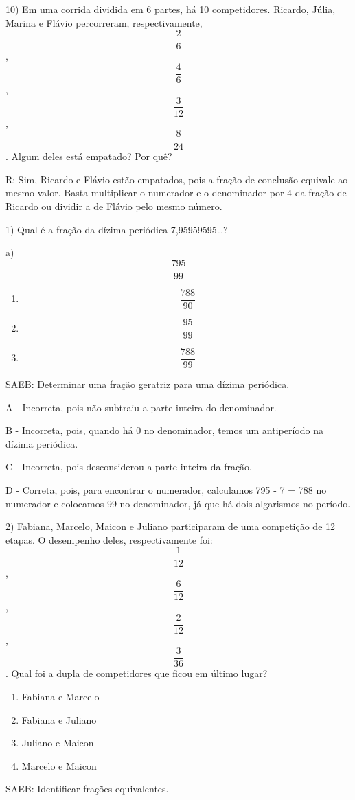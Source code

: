 10) Em uma corrida dividida em 6 partes, há 10 competidores. Ricardo,
Júlia, Marina e Flávio percorreram, respectivamente, \[\frac{2}{6}\],
\[\frac{4}{6}\], \[\frac{3}{12}\], \[\frac{8}{24}\]. Algum deles está
empatado? Por quê?

R: Sim, Ricardo e Flávio estão empatados, pois a fração de conclusão
equivale ao mesmo valor. Basta multiplicar o numerador e o denominador
por 4 da fração de Ricardo ou dividir a de Flávio pelo mesmo número.


1) Qual é a fração da dízima periódica 7,95959595\ldots?

a) \[\frac{795}{99}\]

\begin{enumerate}
\def\labelenumi{\alph{enumi})}
\setcounter{enumi}{1}
\item
  \[\ \frac{788}{90}\]
\item
  \[\ \frac{95}{99}\]
\item
  \[\ \frac{788}{99}\]
\end{enumerate}

SAEB: Determinar uma fração geratriz para uma dízima periódica.

A - Incorreta, pois não subtraiu a parte inteira do denominador.

B - Incorreta, pois, quando há 0 no denominador, temos um antiperíodo na
dízima periódica.

C - Incorreta, pois desconsiderou a parte inteira da fração.

D - Correta, pois, para encontrar o numerador, calculamos 795 - 7 = 788
no numerador e colocamos 99 no denominador, já que há dois algarismos no
período.

2) Fabiana, Marcelo, Maicon e Juliano participaram de uma competição de
12 etapas. O desempenho deles, respectivamente foi: \[\frac{1}{12}\],
\[\frac{6}{12}\], \[\frac{2}{12}\],\[\frac{3}{36}\]. Qual foi a dupla de
competidores que ficou em último lugar?

\begin{enumerate}
\def\labelenumi{\alph{enumi})}
\item
  Fabiana e Marcelo
\item
  Fabiana e Juliano
\item
  Juliano e Maicon
\item
  Marcelo e Maicon
\end{enumerate}

SAEB: Identificar frações equivalentes.

